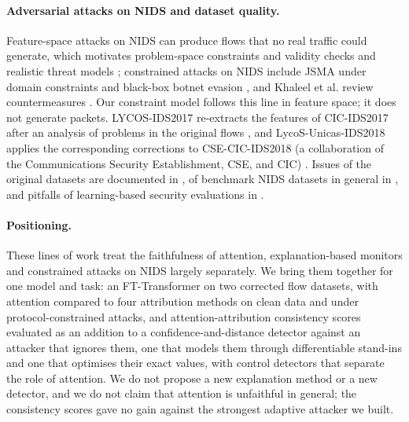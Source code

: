 \paragraph{Adversarial attacks on NIDS and dataset quality.}
Feature-space attacks on NIDS can produce flows that no real traffic could generate, which motivates problem-space
constraints and validity checks \cite{pierazzi2020,alhussien2024} and realistic threat models \cite{apruzzese2022};
constrained attacks on NIDS include JSMA under domain constraints \cite{sheatsley2022} and black-box botnet evasion
\cite{debicha2023}, and Khaleel et al. review countermeasures \cite{khaleel2024}.
Our constraint model follows this line in feature space; it does not generate packets.
LYCOS-IDS2017 re-extracts the features of CIC-IDS2017 after an analysis of problems in the original flows
\cite{rosay2021,rosay2022}, and LycoS-Unicas-IDS2018 applies the corresponding corrections to CSE-CIC-IDS2018 (a collaboration of the Communications Security Establishment, CSE, and CIC) \cite{cantone2024}.
Issues of the original datasets \cite{sharafaldin2018} are documented in \cite{engelen2021,liu2022,lanvin2022}, of
benchmark NIDS datasets in general in \cite{flood2024}, and pitfalls of learning-based security evaluations in
\cite{arp2022}.

\paragraph{Positioning.}
These lines of work treat the faithfulness of attention, explanation-based monitors and constrained attacks on NIDS
largely separately.
We bring them together for one model and task: an FT-Transformer on two corrected flow datasets, with attention
compared to four attribution methods on clean data and under protocol-constrained attacks, and attention-attribution
consistency scores evaluated as an addition to a confidence-and-distance detector against an attacker that ignores them,
one that models them through differentiable stand-ins and one that optimises their exact values, with control detectors
that separate the role of attention.
We do not propose a new explanation method or a new detector, and we do not claim that attention is unfaithful in
general; the consistency scores gave no gain against the strongest adaptive attacker we built.
